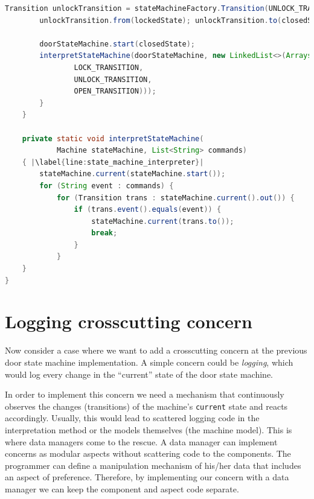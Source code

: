 \begin{sourcecode}
\begin{lstlisting}[language=Java, escapechar=|]
		Transition unlockTransition = stateMachineFactory.Transition(UNLOCK_TRANSITION);
		unlockTransition.from(lockedState); unlockTransition.to(closedState);

		doorStateMachine.start(closedState);
		interpretStateMachine(doorStateMachine, new LinkedList<>(Arrays.asList(
				LOCK_TRANSITION,
				UNLOCK_TRANSITION,
				OPEN_TRANSITION)));
		}	
	}

	private static void interpretStateMachine(
			Machine stateMachine, List<String> commands) 
	{ |\label{line:state_machine_interpreter}|
	    stateMachine.current(stateMachine.start());
		for (String event : commands) {
			for (Transition trans : stateMachine.current().out()) {
				if (trans.event().equals(event)) {
					stateMachine.current(trans.to());
					break;
				}
			}
	}
}
	\end{lstlisting}
	\caption{Door state machine}
	\label{lst:Door_state_machine}
\end{sourcecode}

\section{Logging crosscutting concern}
Now consider a case where we want to add a crosscutting concern at the previous door state machine implementation.
A simple concern could be \textit{logging}, which would log every change in the ``current'' state of the door state machine.

In order to implement this concern we need a mechanism that continuously observes the changes (transitions) of the machine's \texttt{current} state and reacts accordingly.
Usually, this would lead to scattered logging code in the interpretation method or the models themselves (the machine model).
This is where data managers come to the rescue.
A data manager can implement concerns as modular aspects without scattering code to the components.
The programmer can define a manipulation mechanism of his/her data that includes an aspect of preference.
Therefore, by implementing our concern with a data manager we can keep the component and aspect code separate.

